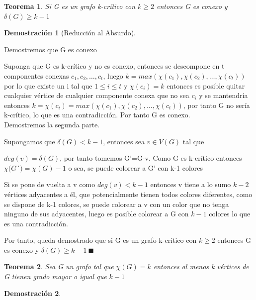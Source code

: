 \documentclass[a4paper,1pt]{report}
\newtheorem*{teo}{Teorema}
\newtheorem*{dem}{Demostración}
\begin{document}
\begin{teo}
 Si G es un grafo k-crítico con $k\geq 2$ entonces G es conexo y $\delta (G)\geq k-1$
\end{teo}

\begin{dem}[Reducci\'on al Absurdo]
 
\end{dem}


Demostremos que G es conexo

Suponga que G es k-crítico y no es conexo, entonces se descompone en t componentes conexas $c_1,c_2,\dots,c_t$, luego $k=max(\chi(c_1),\chi(c_2),\dots,\chi(c_t))$ por lo que existe un i tal que $1\leq i \leq t$ y $\chi(c_i)=k$ entonces es posible quitar cualquier vértice de cualquier componente conexa que no sea $c_i$ y se mantendría entonces $k=\chi(c_i)=max(\chi(c_1),\chi(c_2),\dots,\chi(c_t))$, por tanto G no sería k-crítico, lo que es una contradicción. Por tanto G es conexo.\\

Demostremos la segunda parte.

Supongamos que  $\delta (G)< k-1$, entonces sea $v\in V(G)$ tal que 

$deg(v)=\delta (G)$, por tanto tomemos G'=G-v. Como G es k-crítico entonces $\chi(G$´$)=\chi(G)-1$ o sea, se puede colorear a G' con k-1 colores

Si se pone de vuelta a v como $deg(v)<k-1$ entonces v tiene a lo sumo $k-2$ vértices adyacentes a él, que potencialmente tienen todos colores diferentes, como se dispone de k-1 colores, se puede colorear a v con un color que no tenga ninguno de sus adyacentes, luego es posible colorear a G con $k-1$ colores lo que es una contradicción. 

Por tanto, queda demostrado que si G es un grafo k-crítico con $k\geq 2$ entonces G es conexo y $\delta (G)\geq k-1 \ \blacksquare$

\begin{teo}
 Sea G un grafo tal que $\chi(G)=k$ entonces al menos k vértices de G tienen grado mayor o igual que $k-1$
\end{teo}

\begin{dem}
 
\end{dem}
\end{document}
